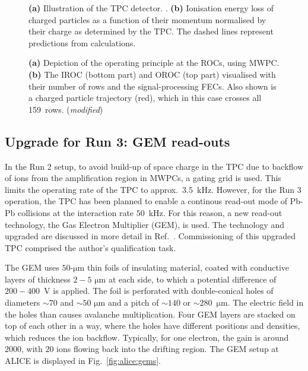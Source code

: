 \begin{figure}[!h]
\caption{\textbf{(a)} Illustration of the TPC detector. \cite{peskovTechnicalDesignReport2014}. \textbf{(b)} Ionisation energy loss of charged particles as a function of their momentum normalised by their charge as determined by the TPC. The dashed lines represent predictions from calculations. \cite{alicecollaborationPerformanceALICEExperiment2014}}
\label{fig:alice:tpc}
\end{figure}

\begin{figure}[!h]
\caption{\textbf{(a)} Depiction of the operating principle at the ROCs, using MWPC. \cite{kalweitProductionLightFlavor2012} \textbf{(b)} The IROC (bottom part) and OROC (top part) visualised with their number of rows and the signal-processing FECs. Also shown is a charged particle trajectory (red), which in this case crosses all 159~rows. \cite{peskovTechnicalDesignReport2014} (\textit{modified})}
\label{fig:alice:rocs}
\end{figure}


\subsection{Upgrade for Run 3: GEM read-outs}

In the Run 2 setup, to avoid build-up of space charge in the TPC due to backflow of ions from the amplification region in MWPCs, a gating grid is used. This limits the operating rate of the TPC to approx.\ $3.5$~kHz. However, for the Run 3 operation, the TPC has been planned to enable a continous read-out mode of Pb-Pb collisions at the interaction rate $50$~kHz. For this reason, a new read-out technology, the Gas Electron Multiplier (GEM), is used. The technology and upgraded are discussed in more detail in Ref.~\cite{adolfssonUpgradeALICETPC2021}. Commissioning of this upgraded TPC comprised the author's qualification task.

The GEM uses $50$-$\mathrm{\mu m}$ thin foils of insulating material, coated with conductive layers of thickness $2-5$ $\mathrm{\mu m}$ at each side, to which a potential difference of $200-400$~V is applied. The foil is perforated with double-conical holes of diameters $\sim 70$ and $\sim 50$ $\mathrm{\mu m}$ and a pitch of $\sim 140$ or $\sim 280$~$\mathrm{\mu m}$. The electric field in the holes than causes avalanche multiplication. Four GEM layers are stacked on top of each other in a way, where the holes have different positions and densities, which reduces the ion backflow. Typically, for one electron, the gain is around $2000$, with $20$ ions flowing back into the drifting region. The GEM setup at ALICE is displayed in Fig.~\ref{fig:alice:gems}.


